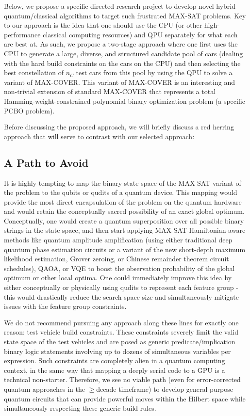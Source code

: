 \documentclass[aps,pra,twocolumn,superscriptaddress,groupedaddress]{revtex4}  %
\begin{document}
Below, we propose a specific directed research project to develop novel hybrid
quantum/classical algorithms to target such frustrated MAX-SAT problems. Key to
our approach is the idea that one should use the CPU (or other high-performance
classical computing resources) and QPU separately for what each are best at. As
such, we propose a two-stage approach where one first uses the CPU to generate a
large, diverse, and structured candidate pool of cars (dealing with the hard
build constraints on the cars on the CPU) and then selecting the best
constellation of $n_{C}$ test cars from this pool by using the QPU to solve a
variant of MAX-COVER. This variant of MAX-COVER is an interesting and
non-trivial extension of standard MAX-COVER that represents a total
Hamming-weight-constrained polynomial binary optimization problem (a specific
PCBO problem). 

Before discussing the proposed approach, we will briefly discuss a red herring
approach that will serve to contrast with our selected approach:

\subsection{A Path to Avoid}

It is highly tempting to map the binary state space of the MAX-SAT variant of
the problem to the qubits or qudits of a quantum device. This mapping would
provide the most direct encapsulation of the problem on the quantum hardware
and would retain the conceptually sacred possibility of an exact global optimum.
Conceptually, one would create a quantum superposition over all possible binary
strings in the state space, and then start applying MAX-SAT-Hamiltonian-aware
methods like quantum amplitude amplification (using either traditional deep
quantum phase estimation circuits or a variant of the new short-depth maximum
likelihood estimation, Grover zeroing, or Chinese remainder theorem circuit
schedules), QAOA, or VQE to boost the observation probability of the global
optimum or other local optima. One could immediately improve this idea by either
conceptually or physically using qudits to represent each feature group - this
would drastically reduce the search space size and simultaneously mitigate
issues with the feature group constraints.

We do not recommend pursuing any approach along these lines for exactly one reason:
test vehicle build constraints. These constraints severely limit the valid state
space of the test vehicles and are posed as generic predicate/implication binary
logic statements involving up to dozens of simultaneous variables per expression. Such
constraints are completely alien in a quantum computing context, in the same way
that mapping a deeply serial code to a GPU is a technical non-starter.
Therefore, we see no viable path (even for error-corrected quantum  approaches in
the $\geq$decade timeframe) to develop general purpose quantum circuits that can
provide powerful moves within the Hilbert space while simultaneously respecting
these generic build rules.
\end{document}
